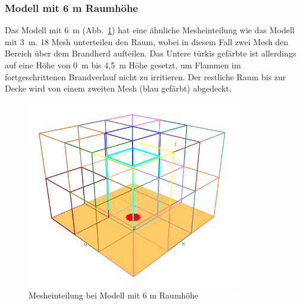 \subsubsection{Modell mit 6 m Raumhöhe}
Das Modell mit 6~m (Abb.~\ref{fig:6mRaumMesh}) hat eine ähnliche Mesheinteilung wie das Modell mit 3~m. 18 Mesh unterteilen den Raum, wobei in diesem Fall zwei Mesh den Bereich über dem Brandherd aufteilen. Das Untere türkis gefärbte ist allerdings auf eine Höhe von 0~m bis 4,5~m Höhe gesetzt, um Flammen im fortgeschrittenen Brandverlauf nicht zu irritieren. Der restliche Raum bis zur Decke wird von einem zweiten Mesh (blau gefärbt) abgedeckt.
\begin{figure}
    \centering
    \includegraphics[width=0.83\textwidth]{images/6mRaumMesh.png}
    \caption{Mesheinteilung bei Modell mit 6 m Raumhöhe}
    \label{fig:6mRaumMesh}
\end{figure}
